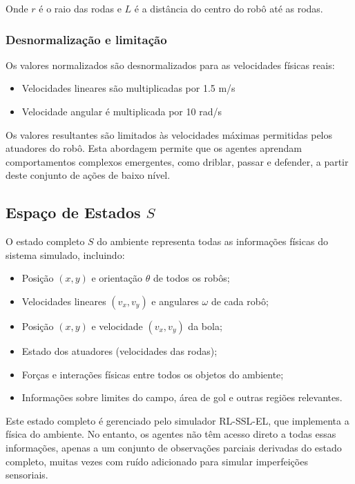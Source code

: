Onde $r$ é o raio das rodas e $L$ é a distância do centro do robô até as rodas.

\subsubsection{Desnormalização e limitação}

Os valores normalizados são desnormalizados para as velocidades físicas reais:
\begin{itemize}
    \item Velocidades lineares são multiplicadas por 1.5 m/s
    \item Velocidade angular é multiplicada por 10 rad/s
\end{itemize}

Os valores resultantes são limitados às velocidades máximas permitidas pelos atuadores do robô. Esta abordagem permite que os agentes aprendam comportamentos complexos emergentes, como driblar, passar e defender, a partir deste conjunto de ações de baixo nível.

\subsection{Espaço de Estados $S$}

O estado completo $S$ do ambiente representa todas as informações físicas do sistema simulado, incluindo:

\begin{itemize}
    \item Posição $(x, y)$ e orientação $\theta$ de todos os robôs;
    \item Velocidades lineares $(v_x, v_y)$ e angulares $\omega$ de cada robô;
    \item Posição $(x, y)$ e velocidade $(v_x, v_y)$ da bola;
    \item Estado dos atuadores (velocidades das rodas);
    \item Forças e interações físicas entre todos os objetos do ambiente;
    \item Informações sobre limites do campo, área de gol e outras regiões relevantes.
\end{itemize}

Este estado completo é gerenciado pelo simulador RL-SSL-EL, que implementa a física do ambiente. No entanto, os agentes não têm acesso direto a todas essas informações, apenas a um conjunto de observações parciais derivadas do estado completo, muitas vezes com ruído adicionado para simular imperfeições sensoriais.

